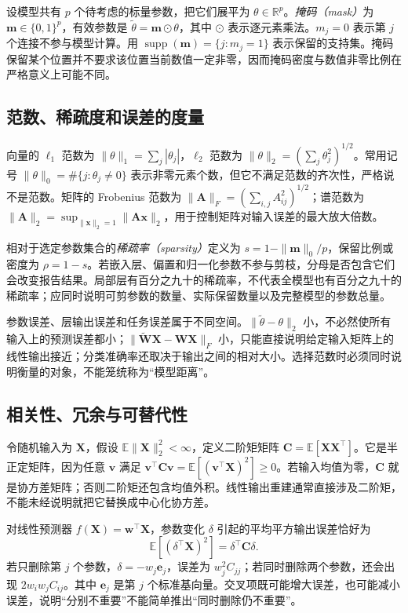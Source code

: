 \documentclass[UTF8,12pt,a4paper,fontset=fandol]{ctexart}
\begin{document}
设模型共有 $p$ 个待考虑的标量参数，把它们展平为 $\theta\in\mathbb R^p$。\emph{掩码（mask）}为 $\mathbf m\in\{0,1\}^p$，有效参数是 $\widetilde\theta=\mathbf m\odot\theta$，其中 $\odot$ 表示逐元素乘法。$m_j=0$ 表示第 $j$ 个连接不参与模型计算。用 $\operatorname{supp}(\mathbf m)=\{j:m_j=1\}$ 表示保留的支持集。掩码保留某个位置并不要求该位置当前数值一定非零，因而掩码密度与数值非零比例在严格意义上可能不同。

\subsection{范数、稀疏度和误差的度量}
向量的 $\ell_1$ 范数为 $\|\theta\|_1=\sum_j|\theta_j|$，$\ell_2$ 范数为 $\|\theta\|_2=(\sum_j\theta_j^2)^{1/2}$。常用记号 $\|\theta\|_0=\#\{j:\theta_j\ne0\}$ 表示非零元素个数，但它不满足范数的齐次性，严格说不是范数。矩阵的 Frobenius 范数为 $\|\mathbf A\|_F=(\sum_{i,j}A_{ij}^2)^{1/2}$；谱范数为 $\|\mathbf A\|_2=\sup_{\|\mathbf x\|_2=1}\|\mathbf A\mathbf x\|_2$，用于控制矩阵对输入误差的最大放大倍数。

相对于选定参数集合的\emph{稀疏率（sparsity）}定义为 $s=1-\|\mathbf m\|_0/p$，保留比例或密度为 $\rho=1-s$。若嵌入层、偏置和归一化参数不参与剪枝，分母是否包含它们会改变报告结果。局部层有百分之九十的稀疏率，不代表全模型也有百分之九十的稀疏率；应同时说明可剪参数的数量、实际保留数量以及完整模型的参数总量。

参数误差、层输出误差和任务误差属于不同空间。$\|\widetilde\theta-\theta\|_2$ 小，不必然使所有输入上的预测误差都小；$\|\widetilde{\mathbf W}\mathbf X-\mathbf W\mathbf X\|_F$ 小，只能直接说明给定输入矩阵上的线性输出接近；分类准确率还取决于输出之间的相对大小。选择范数时必须同时说明衡量的对象，不能笼统称为“模型距离”。

\subsection{相关性、冗余与可替代性}
令随机输入为 $\mathbf X$，假设 $\mathbb E\|\mathbf X\|_2^2<\infty$，定义二阶矩矩阵 $\mathbf C=\mathbb E[\mathbf X\mathbf X^\top]$。它是半正定矩阵，因为任意 $\mathbf v$ 满足 $\mathbf v^\top\mathbf C\mathbf v=\mathbb E[(\mathbf v^\top\mathbf X)^2]\geq0$。若输入均值为零，$\mathbf C$ 就是协方差矩阵；否则二阶矩还包含均值外积。线性输出重建通常直接涉及二阶矩，不能未经说明就把它替换成中心化协方差。

对线性预测器 $f(\mathbf X)=\mathbf w^\top\mathbf X$，参数变化 $\delta$ 引起的平均平方输出误差恰好为
\begin{equation}
 \mathbb E[(\delta^\top\mathbf X)^2]=\delta^\top\mathbf C\delta.
 \label{eq:prune-linear-error}
\end{equation}
若只删除第 $j$ 个参数，$\delta=-w_j\mathbf e_j$，误差为 $w_j^2C_{jj}$；若同时删除两个参数，还会出现 $2w_iw_jC_{ij}$。其中 $\mathbf e_j$ 是第 $j$ 个标准基向量。交叉项既可能增大误差，也可能减小误差，说明“分别不重要”不能简单推出“同时删除仍不重要”。
\end{document}
